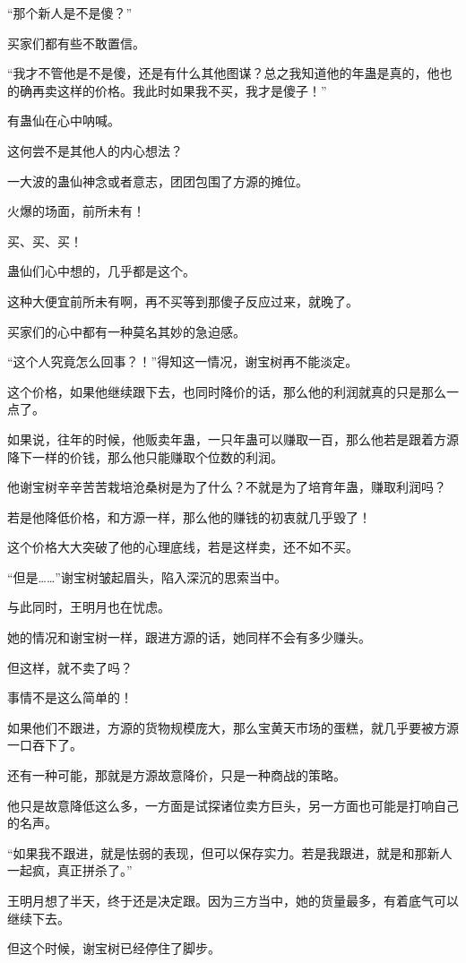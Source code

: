 \begin{this_body}
“那个新人是不是傻？”

买家们都有些不敢置信。

“我才不管他是不是傻，还是有什么其他图谋？总之我知道他的年蛊是真的，他也的确再卖这样的价格。我此时如果我不买，我才是傻子！”

有蛊仙在心中呐喊。

这何尝不是其他人的内心想法？

一大波的蛊仙神念或者意志，团团包围了方源的摊位。

火爆的场面，前所未有！

买、买、买！

蛊仙们心中想的，几乎都是这个。

这种大便宜前所未有啊，再不买等到那傻子反应过来，就晚了。

买家们的心中都有一种莫名其妙的急迫感。

“这个人究竟怎么回事？！”得知这一情况，谢宝树再不能淡定。

这个价格，如果他继续跟下去，也同时降价的话，那么他的利润就真的只是那么一点了。

如果说，往年的时候，他贩卖年蛊，一只年蛊可以赚取一百，那么他若是跟着方源降下一样的价钱，那么他只能赚取个位数的利润。

他谢宝树辛辛苦苦栽培沧桑树是为了什么？不就是为了培育年蛊，赚取利润吗？

若是他降低价格，和方源一样，那么他的赚钱的初衷就几乎毁了！

这个价格大大突破了他的心理底线，若是这样卖，还不如不买。

“但是……”谢宝树皱起眉头，陷入深沉的思索当中。

与此同时，王明月也在忧虑。

她的情况和谢宝树一样，跟进方源的话，她同样不会有多少赚头。

但这样，就不卖了吗？

事情不是这么简单的！

如果他们不跟进，方源的货物规模庞大，那么宝黄天市场的蛋糕，就几乎要被方源一口吞下了。

还有一种可能，那就是方源故意降价，只是一种商战的策略。

他只是故意降低这么多，一方面是试探诸位卖方巨头，另一方面也可能是打响自己的名声。

“如果我不跟进，就是怯弱的表现，但可以保存实力。若是我跟进，就是和那新人一起疯，真正拼杀了。”

王明月想了半天，终于还是决定跟。因为三方当中，她的货量最多，有着底气可以继续下去。

但这个时候，谢宝树已经停住了脚步。


\end{this_body}
